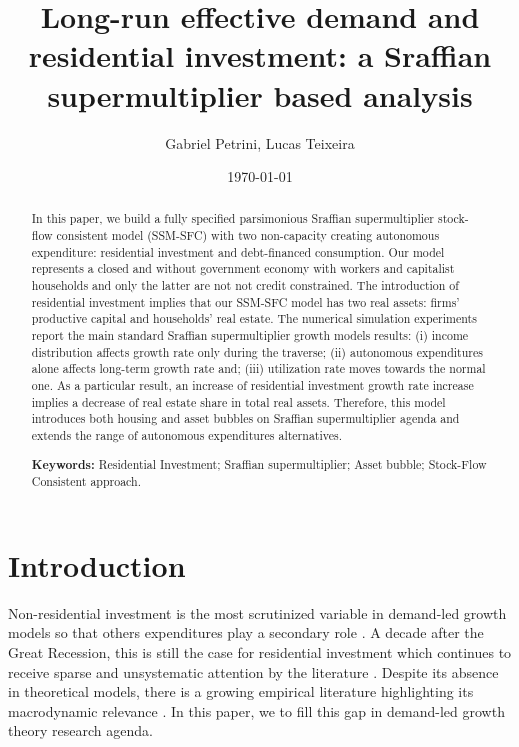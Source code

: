 \documentclass[11pt]{article}
\author{Gabriel Petrini, Lucas Teixeira}
\date{\today}
\title{Long-run effective demand and residential investment: a Sraffian supermultiplier based analysis}
\begin{document}
\maketitle
\begin{abstract}
In this paper, we build a fully specified parsimonious Sraffian supermultiplier stock-flow consistent model (SSM-SFC) with two non-capacity creating autonomous expenditure: residential investment and debt-financed consumption.
Our model represents a closed and without government economy with workers and capitalist households and only the latter are not not credit constrained.
The introduction of residential investment implies that our SSM-SFC model has two real assets: firms' productive capital and households' real estate.
The numerical simulation experiments report the main standard Sraffian supermultiplier growth models results: 
    (i) income distribution affects growth rate only during the traverse;
    (ii) autonomous expenditures alone affects long-term growth rate and;
    (iii)  utilization rate moves towards the normal one.
As a particular result, an increase of residential investment growth rate increase implies a decrease of real estate share in total real assets.
Therefore, this model introduces both housing and asset bubbles	on Sraffian supermultiplier agenda and extends the range of autonomous expenditures alternatives.

\noindent \textbf{Keywords:} Residential Investment; Sraffian supermultiplier; Asset bubble;  Stock-Flow Consistent approach.
\end{abstract}


\section{Introduction}
\label{sec:orgfdcb2e0}
\label{sec:introduction}

Non-residential investment is the most scrutinized variable in demand-led growth models so that others expenditures play a secondary role \cite{brochier_macroeconomics_2017}.
A decade after the Great Recession, this is still the case for residential investment which continues to receive sparse and unsystematic attention by the literature \cites{caverzasi_stock-flow_2013}{nikolaidi_minsky_2017}.
Despite its absence in theoretical models, there is a growing empirical literature highlighting its macrodynamic relevance \cites{leamer_housing_2007}{jorda_great_2014}{fiebiger_semi-autonomous_2018}{fiebiger_trend_2017}.
In this paper, we to fill this gap in demand-led growth theory research agenda.
\end{document}
